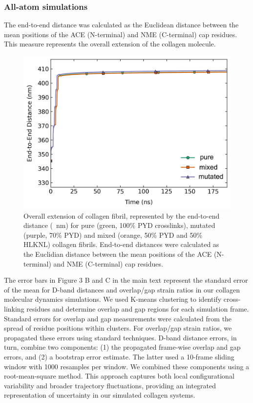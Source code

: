 \documentclass[10pt,letterpaper]{article}
\begin{document}
\subsubsection*{All-atom simulations}

The end-to-end distance was calculated as the Euclidean distance between the mean positions of the ACE (N-terminal) and NME (C-terminal) cap residues. This measure represents the overall extension of the collagen molecule.

\begin{figure}[!h]
    \centering
    \includegraphics[width=0.5\linewidth]{figures/end-to-end_distance.png}
    \caption{Overall extension of collagen fibril, represented by the end-to-end distance (\SI{}{\nano\meter}) for pure (green, 100\% PYD crosslinks), mutated (purple, 70\% PYD) and mixed (orange, 50\% PYD and 50\% HLKNL) collagen fibrils. End-to-end distances were calculated as the Euclidian distance between the mean positions of the ACE (N-terminal) and NME (C-terminal) cap residues.}
    \label{fig:SI_e2e_distance}
\end{figure}

The error bars in Figure 3 B and C in the main text represent the standard error of the mean for D-band distances and overlap/gap strain ratios in our collagen molecular dynamics simulations. We used K-means clustering to identify cross-linking residues and determine overlap and gap regions for each simulation frame. Standard errors for overlap and gap measurements were calculated from the spread of residue positions within clusters. For overlap/gap strain ratios, we propagated these errors using standard techniques. D-band distance errors, in turn, combine two components: (1) the propagated frame-wise overlap and gap errors, and (2) a bootstrap error estimate. The latter used a 10-frame sliding window with 1000 resamples per window. We combined these components using a root-mean-square method. This approach captures both local configurational variability and broader trajectory fluctuations, providing an integrated representation of uncertainty in our simulated collagen systems.
\end{document}

